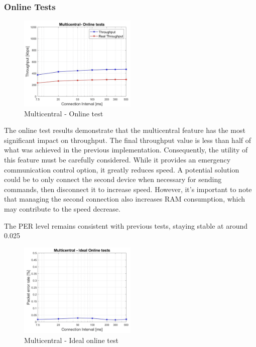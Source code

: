 \documentclass{Configuration_Files/PoliMi3i_thesis}
\begin{document}
\subsubsection*{Online Tests}

\begin{figure}[H]
    \centering
    \includegraphics[width=0.5\textwidth]{Results Manuel/figure27}
    \caption{Multicentral - Online test}
    \label{manuel_results_27}
\end{figure}

The online test results demonstrate that the multicentral feature has the most significant impact on throughput. The final throughput value is less than half of what was achieved in the previous implementation. Consequently, the utility of this feature must be carefully considered. While it provides an emergency communication control option, it greatly reduces speed. A potential solution could be to only connect the second device when necessary for sending commands, then disconnect it to increase speed. However, it's important to note that managing the second connection also increases RAM consumption, which may contribute to the speed decrease.

The PER level remains consistent with previous tests, staying stable at around 0.025%

\begin{figure}[H]
    \centering
    \includegraphics[width=0.5\textwidth]{Results Manuel/figure28}
    \caption{Multicentral - Ideal online test}
    \label{manuel_results_28}
\end{figure}
\end{document}
